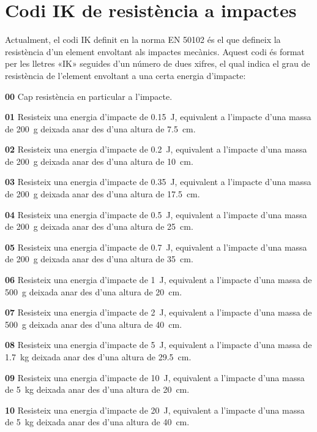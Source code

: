 \section{Codi IK de resistència a impactes}   

Actualment, el codi IK definit en la norma EN 50102 és el que defineix la resistència d'un element  envoltant als impactes mecànics. Aquest codi és format per les lletres «IK» seguides d'un número de dues xifres, el qual indica el grau de resistència de l'element envoltant a una certa energia d'impacte:

\begin{list}{}
   {\setlength{\labelwidth}{10mm} \setlength{\leftmargin}{10mm} \setlength{\labelsep}{2mm}}
   \item[\textbf{00}] Cap resistència en particular a l'impacte.
   \item[\textbf{01}] Resisteix una energia d'impacte de \SI{0,15}{J}, equivalent a l'impacte d'una massa de \SI{200}{g} deixada anar des d'una altura de \SI{7,5}{cm}.
   \item[\textbf{02}] Resisteix una energia d'impacte de \SI{0,2}{J}, equivalent a l'impacte d'una massa de \SI{200}{g} deixada anar des d'una altura de \SI{10}{cm}.
   \item[\textbf{03}] Resisteix una energia d'impacte de \SI{0,35}{J}, equivalent a l'impacte d'una massa de \SI{200}{g} deixada anar des d'una altura de \SI{17,5}{cm}.
   \item[\textbf{04}] Resisteix una energia d'impacte de \SI{0,5}{J}, equivalent a l'impacte d'una massa de \SI{200}{g} deixada anar des d'una altura de \SI{25}{cm}.
   \item[\textbf{05}] Resisteix una energia d'impacte de \SI{0,7}{J}, equivalent a l'impacte d'una massa de \SI{200}{g} deixada anar des d'una altura de \SI{35}{cm}.
   \item[\textbf{06}]Resisteix una energia d'impacte de \SI{1}{J}, equivalent a l'impacte d'una massa de \SI{500}{g} deixada anar des d'una altura de \SI{20}{cm}.
   \item[\textbf{07}]Resisteix una energia d'impacte de \SI{2}{J}, equivalent a l'impacte d'una massa de \SI{500}{g} deixada anar des d'una altura de \SI{40}{cm}.
   \item[\textbf{08}]Resisteix una energia d'impacte de \SI{5}{J}, equivalent a l'impacte d'una massa de \SI{1,7}{kg} deixada anar des d'una altura de \SI{29,5}{cm}.
   \item[\textbf{09}]Resisteix una energia d'impacte de \SI{10}{J}, equivalent a l'impacte d'una massa de \SI{5}{kg} deixada anar des d'una altura de \SI{20}{cm}.
   \item[\textbf{10}]Resisteix una energia d'impacte de \SI{20}{J}, equivalent a l'impacte d'una massa de \SI{5}{kg} deixada anar des d'una altura de \SI{40}{cm}.
\end{list}



